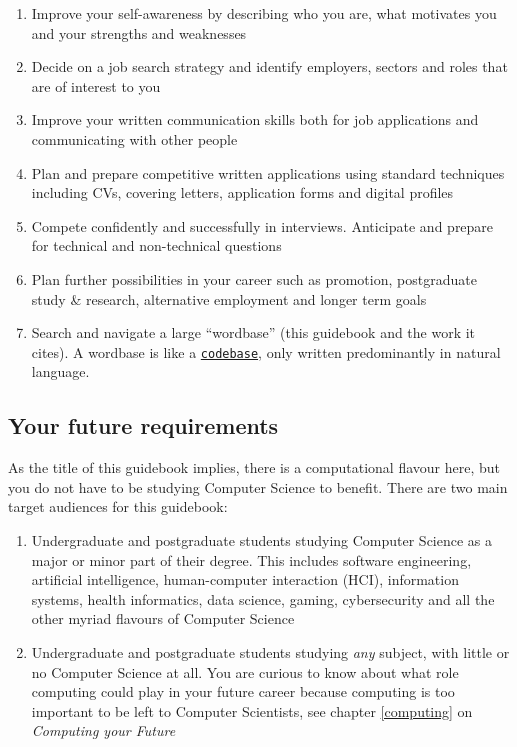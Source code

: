 \documentclass[
]{book}
\providecommand{\tightlist}{%
  \setlength{\itemsep}{0pt}\setlength{\parskip}{0pt}}
\begin{document}
\begin{enumerate}
\def\labelenumi{\arabic{enumi}.}
\tightlist
\item
  Improve your self-awareness by describing who you are, what motivates you and your strengths and weaknesses
\item
  Decide on a job search strategy and identify employers, sectors and roles that are of interest to you\\
\item
  Improve your written communication skills both for job applications and communicating with other people
\item
  Plan and prepare competitive written applications using standard techniques including CVs, covering letters, application forms and digital profiles
\item
  Compete confidently and successfully in interviews. Anticipate and prepare for technical and non-technical questions
\item
  Plan further possibilities in your career such as promotion, postgraduate study \& research, alternative employment and longer term goals
\item
  Search and navigate a large ``wordbase'' (this guidebook and the work it cites). A wordbase is like a \href{https://en.wikipedia.org/wiki/Codebase}{\texttt{codebase}}, only written predominantly in natural language.
\end{enumerate}

\hypertarget{prereq}{%
\subsection{Your future requirements}\label{prereq}}

As the title of this guidebook implies, there is a computational flavour here, but you do not have to be studying Computer Science to benefit. There are two main target audiences for this guidebook:

\begin{enumerate}
\def\labelenumi{\arabic{enumi}.}
\tightlist
\item
  Undergraduate and postgraduate students studying Computer Science as a major or minor part of their degree. This includes software engineering, artificial intelligence, human-computer interaction (HCI), information systems, health informatics, data science, gaming, cybersecurity and all the other myriad flavours of Computer Science
\item
  Undergraduate and postgraduate students studying \emph{any} subject, with little or no Computer Science at all. You are curious to know about what role computing could play in your future career because computing is too important to be left to Computer Scientists, see chapter \ref{computing} on \emph{Computing your Future}
\end{enumerate}
\end{document}
